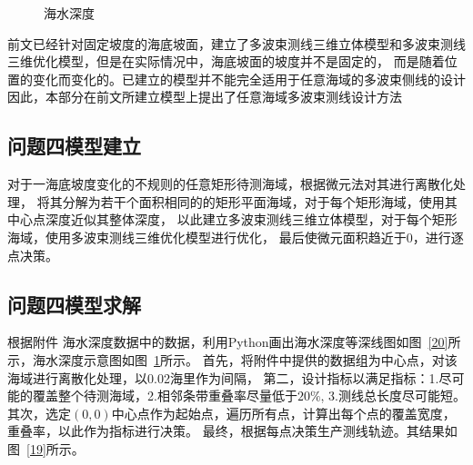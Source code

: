 \documentclass[withoutpreface,bwprint]{cumcmthesis} %
\begin{document}
\begin{figure}[htbp]
\begin{minipage}[c]{0.48\textwidth}
            \label{32}
        \end{minipage}
        \caption{海水深度}
    \end{figure}

    前文已经针对固定坡度的海底坡面，建立了多波束测线三维立体模型和多波束测线三维优化模型，但是在实际情况中，海底坡面的坡度并不是固定的，
    而是随着位置的变化而变化的。已建立的模型并不能完全适用于任意海域的多波束侧线的设计
    因此，本部分在前文所建立模型上提出了任意海域多波束测线设计方法
    \subsection{问题四模型建立}
        对于一海底坡度变化的不规则的任意矩形待测海域，根据微元法对其进行离散化处理，
        将其分解为若干个面积相同的的矩形平面海域，对于每个矩形海域，使用其中心点深度近似其整体深度，
        以此建立多波束测线三维立体模型，对于每个矩形海域，使用多波束测线三维优化模型进行优化，
        最后使微元面积趋近于0，进行逐点决策。
     
               \subsection{问题四模型求解}

                
   

               根据附件 海水深度数据中的数据，利用Python画出海水深度等深线图如图~\ref{20}所示，海水深度示意图如图~\ref{32}所示。
               首先，将附件中提供的数据组为中心点，对该海域进行离散化处理，以0.02海里作为间隔，
               第二，设计指标以满足指标：1.尽可能的覆盖整个待测海域，2.相邻条带重叠率尽量低于$20\%$, 3.测线总长度尽可能短。 
               其次，选定$(0,0)$中心点作为起始点，遍历所有点，计算出每个点的覆盖宽度，重叠率，以此作为指标进行决策。
               最终，根据每点决策生产测线轨迹。其结果如图~\ref{19}所示。
\end{document}
